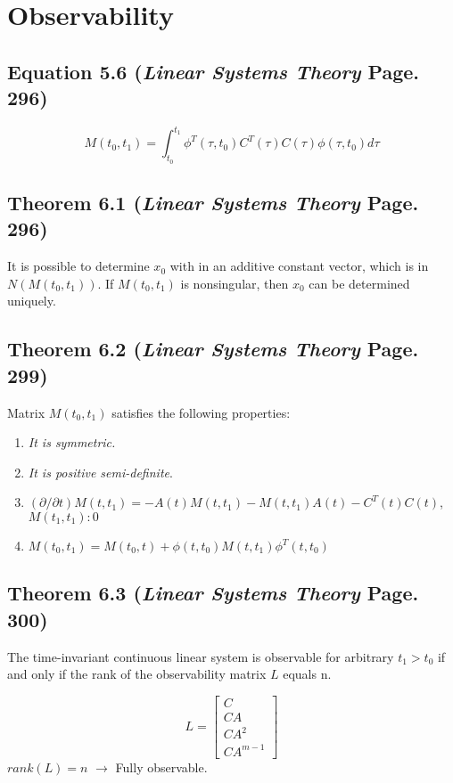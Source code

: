 \documentclass[12pt]{article}
\begin{document}
\newpage
\section*{Observability}

\subsection*{Equation 5.6 ({\em Linear Systems Theory} Page. 296)}
$$M(t_0,t_1)=\int_{t_0}^{t_1}\phi^T(\tau,t_0)C^T(\tau)C(\tau)\phi(\tau,t_0)d\tau$$

\subsection*{Theorem 6.1 ({\em Linear Systems Theory} Page. 296)}
It is possible to determine $x_0$ with in an additive constant vector, which is in $N(M(t_0,t_1))$. If $M(t_0,t_1)$ is nonsingular, then $x_0$ can be determined uniquely.

\subsection*{Theorem 6.2 ({\em Linear Systems Theory} Page. 299)}
Matrix $M(t_0,t_1)$ satisfies the following properties:
\renewcommand{\labelenumiii}{\Roman{enumii}}
\begin{enumerate}
  \item {\em It is symmetric.}
  \item {\em It is positive semi-definite}. 
  \item $(\partial/\partial t)M(t,t_1)=-A(t)M(t,t_1)-M(t,t_1)A(t)-C^T(t)C(t)$, \\$M(t_1,t_1):0$
  \item $M(t_0,t_1)=M(t_0,t)+\phi(t,t_0)M(t,t_1)\phi^T(t,t_0)$
\end{enumerate}

\subsection*{Theorem 6.3 ({\em Linear Systems Theory} Page. 300)}
The time-invariant continuous linear system is observable for arbitrary $t_1>t_0$ if and only if the rank of the observability matrix $L$ equals n.

$$L=\begin{bmatrix}
C \\
CA \\
CA^2 \\
CA^{m-1}
\end{bmatrix}
$$
$rank(L)=n$ $\rightarrow$ Fully observable.
\end{document}
